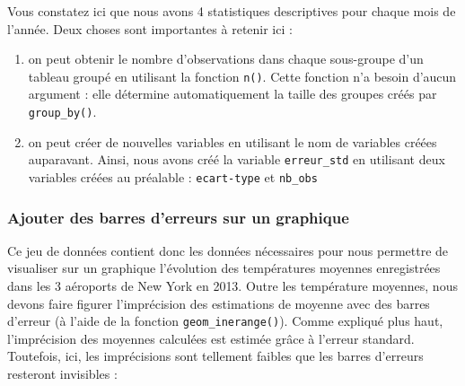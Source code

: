 \documentclass[a4paperpaper,]{article}
\newenvironment{Shaded}{\begin{snugshade}}{\end{snugshade}}
\newcommand{\KeywordTok}[1]{\textcolor[rgb]{0.13,0.29,0.53}{\textbf{#1}}}
\newcommand{\DataTypeTok}[1]{\textcolor[rgb]{0.13,0.29,0.53}{#1}}
\newcommand{\DecValTok}[1]{\textcolor[rgb]{0.00,0.00,0.81}{#1}}
\newcommand{\StringTok}[1]{\textcolor[rgb]{0.31,0.60,0.02}{#1}}
\newcommand{\OperatorTok}[1]{\textcolor[rgb]{0.81,0.36,0.00}{\textbf{#1}}}
\newcommand{\NormalTok}[1]{#1}
\providecommand{\tightlist}{%
  \setlength{\itemsep}{0pt}\setlength{\parskip}{0pt}}
\theoremstyle{definition}
\theoremstyle{definition}
\theoremstyle{definition}
\theoremstyle{remark}
\begin{document}
Vous constatez ici que nous avons 4 statistiques descriptives pour
chaque mois de l'année. Deux choses sont importantes à retenir ici :

\begin{enumerate}
\def\labelenumi{\arabic{enumi}.}
\tightlist
\item
  on peut obtenir le nombre d'observations dans chaque sous-groupe d'un
  tableau groupé en utilisant la fonction \texttt{n()}. Cette fonction
  n'a besoin d'aucun argument : elle détermine automatiquement la taille
  des groupes créés par \texttt{group\_by()}.
\item
  on peut créer de nouvelles variables en utilisant le nom de variables
  créées auparavant. Ainsi, nous avons créé la variable
  \texttt{erreur\_std} en utilisant deux variables créées au préalable :
  \texttt{ecart-type} et \texttt{nb\_obs}
\end{enumerate}

\subsubsection{Ajouter des barres d'erreurs sur un
graphique}\label{ajouter-des-barres-derreurs-sur-un-graphique}

Ce jeu de données contient donc les données nécessaires pour nous
permettre de visualiser sur un graphique l'évolution des températures
moyennes enregistrées dans les 3 aéroports de New York en 2013. Outre
les température moyennes, nous devons faire figurer l'imprécision des
estimations de moyenne avec des barres d'erreur (à l'aide de la fonction
\texttt{geom\_inerange()}). Comme expliqué plus haut, l'imprécision des
moyennes calculées est estimée grâce à l'erreur standard. Toutefois,
ici, les imprécisions sont tellement faibles que les barres d'erreurs
resteront invisibles :

\begin{Shaded}
\end{Shaded}
\end{document}

